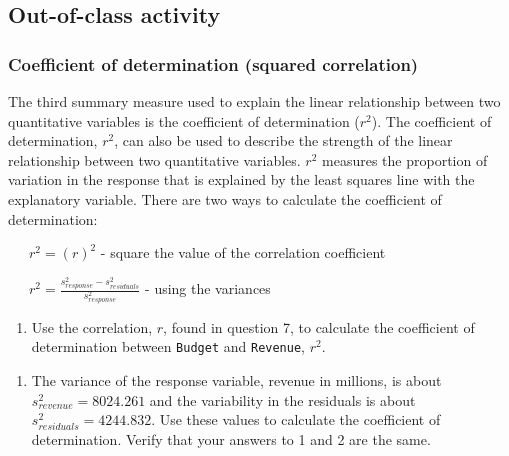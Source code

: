 \documentclass[
]{report}
\providecommand{\tightlist}{%
  \setlength{\itemsep}{0pt}\setlength{\parskip}{0pt}}
\begin{document}
\vspace{.2in}

\hypertarget{out-of-class-activity-4}{%
\subsection{Out-of-class activity}\label{out-of-class-activity-4}}

\hypertarget{coefficient-of-determination-squared-correlation}{%
\subsubsection*{Coefficient of determination (squared correlation)}\label{coefficient-of-determination-squared-correlation}}

The third summary measure used to explain the linear relationship between two quantitative variables is the coefficient of determination (\(r^2\)). The coefficient of determination, \(r^2\), can also be used to describe the strength of the linear relationship between two quantitative variables. \(r^2\) measures the proportion of variation in the response that is explained by the least squares line with the explanatory variable. There are two ways to calculate the coefficient of determination:

~~~\(r^2 = (r)^2\) - square the value of the correlation coefficient

~~~\(r^2 = \frac{s_{response}^2 - s_{residuals}^2}{s_{response}^2}\) - using the variances

\begin{enumerate}
\def\labelenumi{\arabic{enumi}.}
\tightlist
\item
  Use the correlation, \(r\), found in question 7, to calculate the coefficient of determination between \texttt{Budget} and \texttt{Revenue}, \(r^2\).
\end{enumerate}

\vspace{.4in}

\begin{enumerate}
\def\labelenumi{\arabic{enumi}.}
\setcounter{enumi}{1}
\tightlist
\item
  The variance of the response variable, revenue in millions, is about \(s_{revenue}^2 = 8024.261\) and the variability in the residuals is about \(s_{residuals}^2 = 4244.832\). Use these values to calculate the coefficient of determination. Verify that your answers to 1 and 2 are the same.
\end{enumerate}
\end{document}
